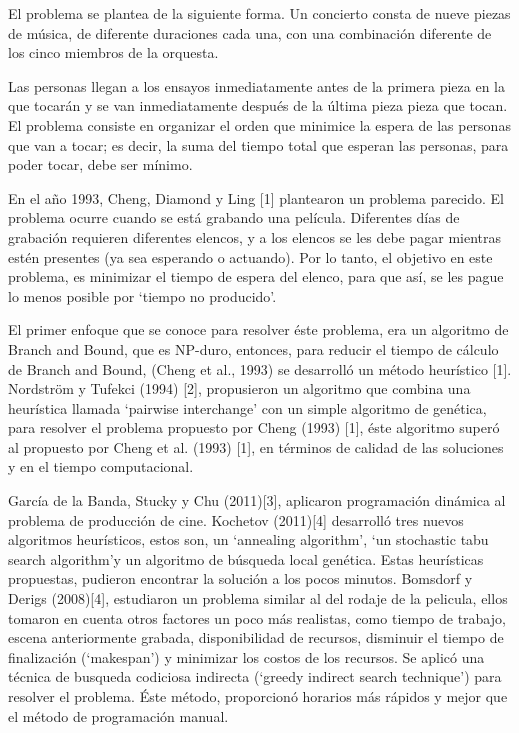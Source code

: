\documentclass[journal, 10pt]{IEEEtran}
\begin{document}
El problema se plantea de la siguiente forma. Un concierto consta de nueve piezas de música, de diferente duraciones cada una, con una combinación diferente de los cinco miembros de la orquesta.

Las personas llegan a los ensayos inmediatamente antes de la primera pieza en la que tocarán y se van inmediatamente después de la última pieza pieza que tocan. El problema consiste en organizar el orden que minimice la espera de las personas que van a tocar; es decir, la suma del tiempo total que esperan las personas, para poder tocar, debe ser mínimo.

En el año 1993, Cheng, Diamond y Ling [1] plantearon un problema parecido. El problema ocurre cuando se está grabando una película. Diferentes días de grabación requieren diferentes elencos, y a los elencos se les debe pagar mientras estén presentes (ya sea esperando o actuando). Por lo tanto, el objetivo en este problema, es minimizar el tiempo de espera del elenco, para que así, se les pague lo menos posible por `tiempo no producido'.

El primer enfoque que se conoce para resolver éste problema, era un algoritmo de Branch and Bound, que es NP-duro, entonces, para reducir el tiempo de cálculo de Branch and Bound, (Cheng et al., 1993) se desarrolló un método heurístico [1]. Nordström y Tufekci (1994) [2], propusieron un algoritmo que combina una heurística llamada `pairwise interchange' con un simple algoritmo de genética, para resolver el problema propuesto por Cheng (1993) [1], éste algoritmo superó al propuesto por Cheng et al. (1993) [1], en términos de calidad de las soluciones y en el tiempo computacional.

García de la Banda, Stucky y Chu (2011)[3], aplicaron programación dinámica al problema de producción de cine. Kochetov (2011)[4] desarrolló tres nuevos algoritmos heurísticos, estos son, un `annealing algorithm', `un stochastic tabu search algorithm'y un algoritmo de búsqueda local genética. Estas heurísticas propuestas, pudieron encontrar la solución a los pocos minutos. Bomsdorf y Derigs (2008)[4], estudiaron un problema similar al del rodaje de la pelicula, ellos tomaron en cuenta otros factores un poco más realistas, como tiempo de trabajo, escena anteriormente grabada, disponibilidad de recursos, disminuir el tiempo de finalización (`makespan') y minimizar los costos de los recursos. Se aplicó una técnica de busqueda codiciosa indirecta (`greedy indirect search technique') para resolver el problema. Éste método, proporcionó horarios más rápidos y mejor que el método de programación manual.
\end{document}
